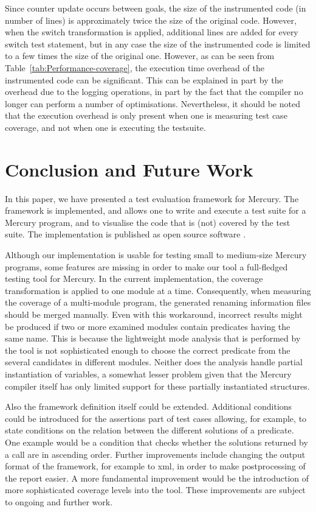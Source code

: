 \documentclass[british]{llncs}
\begin{document}
Since counter update occurs between goals, the size of the instrumented code (in number of lines) is approximately twice the size of the original code. However, when the switch transformation is applied, additional lines are added
for every switch test statement, but in any case the size of the instrumented code is limited to a few times the size of the original one. However, as can be seen from Table~\ref{tab:Performance-coverage}, the execution time overhead of the instrumented code can be significant. This can be explained in part by the overhead due to the logging operations, in part by the fact that the compiler no longer can perform a number of optimisations. Nevertheless, it should be noted
that the execution overhead is only present when one is measuring test case coverage, and not when one is executing the testsuite. 





\section{Conclusion and Future Work}

In this paper, we have presented a test evaluation framework for Mercury. The framework is implemented, and allows one to write and execute a test suite for a Mercury program, and to visualise the code that is (not) covered by the test suite. The implementation is published as open source software \cite{Biener:MercuryTest}. 


Although our implementation is usable for testing small to medium-size Mercury programs, some features are missing in order to make our tool a full-fledged testing tool for Mercury. In the current implementation, the coverage transformation is applied to one module at a time. Consequently, when measuring the coverage of a multi-module program, the generated renaming information files should be merged manually. Even with this workaround, incorrect
results might be produced if two or more examined modules contain predicates having the same name. This is because the lightweight mode analysis that is performed by the tool is not sophisticated enough to choose the correct predicate from
the several candidates in different modules. Neither does the analysis handle partial
instantiation of variables, a somewhat lesser problem given that the Mercury compiler itself has only limited support for these partially instantiated structures.



Also the framework definition itself could be extended. 
Additional conditions could be introduced for the assertions
part of test cases allowing, for example, to state conditions on the relation between the different
solutions of a predicate. One example would be a condition that
checks whether the solutions returned by a call are in ascending order. Further improvements include changing the output format of the framework, for example to xml, in order to make postprocessing of the report easier. A more fundamental improvement would be the introduction of more sophisticated coverage levels into the tool. These improvements are subject to ongoing and further work.
\end{document}
